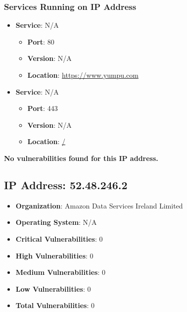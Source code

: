 \documentclass{article}
\begin{document}
\subsubsection*{Services Running on IP Address}

\begin{itemize}
    
        \item \textbf{Service}: N/A
        \begin{itemize}
            \item \textbf{Port}: 80
            \item \textbf{Version}:  N/A 
            \item \textbf{Location}: \href{ https://www.yumpu.com }{ https://www.yumpu.com }
        \end{itemize}
    
        \item \textbf{Service}: N/A
        \begin{itemize}
            \item \textbf{Port}: 443
            \item \textbf{Version}:  N/A 
            \item \textbf{Location}: \href{ / }{ / }
        \end{itemize}
    
\end{itemize}


\textbf{No vulnerabilities found for this IP address.}




\clearpage



\subsection{IP Address: 52.48.246.2}

\begin{itemize}
    \item \textbf{Organization}: Amazon Data Services Ireland Limited
    \item \textbf{Operating System}:  N/A 
    \item \textbf{Critical Vulnerabilities}: 0
    \item \textbf{High Vulnerabilities}: 0
    \item \textbf{Medium Vulnerabilities}: 0
    \item \textbf{Low Vulnerabilities}: 0
    \item \textbf{Total Vulnerabilities}: 0
\end{itemize}
\end{document}
